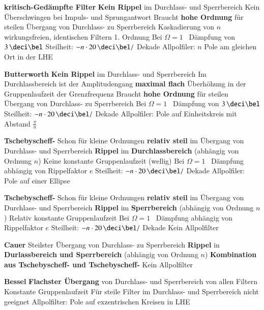 \begin{outline}
    \1 \textbf{kritisch-Gedämpfte Filter}
        \2[+] \textbf{Kein Rippel} im Durchlass- und Sperrbereich
        \2[+] Kein Überschwingen bei Impuls- und Sprungantwort
        \2[-] Braucht \textbf{hohe Ordnung} für steilen Übergang von Durchlass- zu Sperrbereich
        \2    Kaskadierung von $n$ wirkungsfreien, identischen Filtern 1. Ordnung
        \2    Bei $\Omega = 1$ \textrightarrow\ Dämpfung von $3 \, \deci \bel$
        \2    Steilheit: $- n \cdot 20 \, \deci \bel /$ Dekade
        \2    Allpolfiler: $n$ Pole am gleichen Ort in der LHE

    \1 \textbf{Butterworth}
        \2[+] \textbf{Kein Rippel} im Durchlass- und Sperrbereich
        \2[+] Im Durchlassbereich ist der Amplitudengang \textbf{maximal flach}
        \2[-] Überhöhung in der Gruppenlaufzeit der Grenzfrequenz
        \2[-] Braucht \textbf{hohe Ordnung} für steilen Übergang von Durchlass- zu Sperrbereich
        \2    Bei $\Omega = 1$ \textrightarrow\ Dämpfung von $3 \, \deci \bel$
        \2    Steilheit: $- n \cdot 20 \, \deci \bel /$ Dekade
        \2    Allpolfiler: Pole auf Einheitskreis mit Abstand $\frac{\pi}{n}$ 

    \1 \textbf{Tschebyscheff-}
        \2[+] Schon für kleine Ordnungen \textbf{relativ steil} im Übergang von Durchlass- und Sperrbereich
        \2[-] \textbf{Rippel} im \textbf{Durchlassbereich} (abhängig von Ordnung $n$)
        \2[-] Keine konstante Gruppenlaufzeit (wellig)
        \2    Bei $\Omega = 1$ \textrightarrow\ Dämpfung abhängig von Rippelfaktor $e$
        \2    Steilheit: $- n \cdot 20 \, \deci \bel /$ Dekade
        \2    Allpolfiler: Pole auf einer Ellipse

    \1 \textbf{Tschebyscheff-}
        \2[+] Schon für kleine Ordnungen \textbf{relativ steil} im Übergang von Durchlass- und Sperrbereich
        \2[-] \textbf{Rippel} im \textbf{Sperrbereich} (abhängig von Ordnung $n$)
        \2[-] Relativ konstante Gruppenlaufzeit
        \2    Bei $\Omega = 1$ \textrightarrow\ Dämpfung abhängig von Rippelfaktor $e$
        \2    Steilheit: $- n \cdot 20 \, \deci \bel /$ Dekade
        \2    Kein Allpolfilter

    \1 \textbf{Cauer}
        \2[+] Steilster Übergang von Durchlass- zu Sperrbereich
        \2[-] \textbf{Rippel} in \textbf{Durlassbereich und Sperrbereich} (abhängig von Ordnung $n$)
        \2    \textbf{Kombination aus Tschebyscheff- und Tschebyscheff-}
        \2    Kein Allpolfilter

    \1 \textbf{Bessel}
        \2[+] \textbf{Flachster Übergang} von Durchlass- und Sperrbereich von allen Filtern
        \2[+] Konstante Gruppenlaufzeit
        \2[-] Für steile Filter im Durchlass- und Sperrbereich nicht geeignet
        \2    Allpolfilter: Pole auf exzentrischen Kreisen in LHE
\end{outline}


